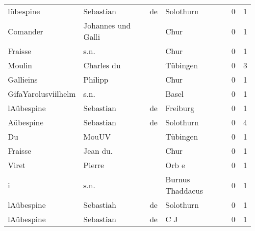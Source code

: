 \begin{center}
\begin{tiny}
\begin{longtabu}{llllrr}
                lübespine &                          Sebastian &          de &                                   Solothurn &          0 &         1 \\
                 Comander &                 Johannes und Galli &             &                                        Chur &          0 &         1 \\
                  Fraisse &                               s.n. &             &                                        Chur &          0 &         1 \\
                   Moulin &                         Charles du &             &                                    Tübingen &          0 &         3 \\
                Gallieins &                            Philipp &             &                                        Chur &          0 &         1 \\
      GifaYarolusviilhelm &                               s.n. &             &                                       Basel &          0 &         1 \\
               lAübespine &                          Sebastian &          de &                                    Freiburg &          0 &         1 \\
                Aübespine &                          Sebastian &          de &                                   Solothurn &          0 &         4 \\
                       Du &                              MouUV &             &                                    Tübingen &          0 &         1 \\
                  Fraisse &                           Jean du. &             &                                        Chur &          0 &         1 \\
                    Viret &                             Pierre &             &                                       Orb e &          0 &         1 \\
                        i &                               s.n. &             &                            Burnus Thaddaeus &          0 &         1 \\
               lAübespine &                          Sebastiah &          de &                                   Solothurn &          0 &         1 \\
               lAübespine &                          Sebastian &          de &                                         C J &          0 &         1 \\

\end{longtabu}
\end{tiny}
\end{center}
